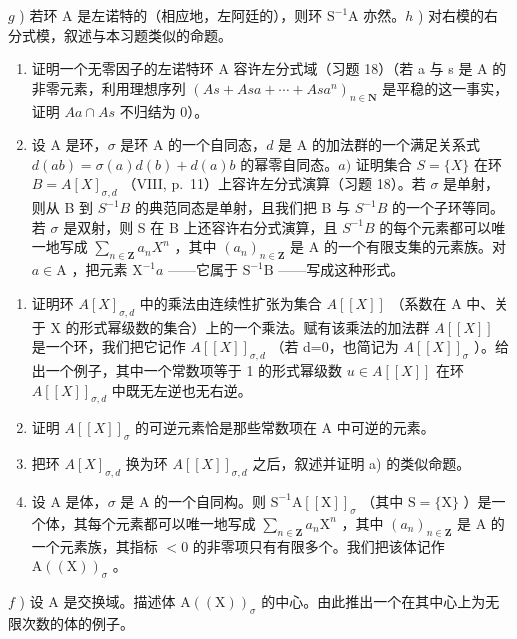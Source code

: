 \(g\) ) 若环 A 是左诺特的（相应地，左阿廷的），则环 \(\mathrm{S}^{-1}\mathrm{A}\) 亦然。\(h\) ) 对右模的右分式模，叙述与本习题类似的命题。

\begin{enumerate}
\def\labelenumi{\arabic{enumi})}
\setcounter{enumi}{19}
\item
  证明一个无零因子的左诺特环 A 容许左分式域（习题 18）（若 a 与 s 是 A 的非零元素，利用理想序列 \((As + Asa + \cdots + Asa^{n})_{n \in \mathbf{N}}\) 是平稳的这一事实，证明 \(Aa \cap As\) 不归结为 0）。
\item
  设 A 是环，\(\sigma\) 是环 A 的一个自同态，\(d\) 是 A 的加法群的一个满足关系式 \(d(ab) = \sigma(a)d(b) + d(a)b\) 的幂零自同态。\(a)\) 证明集合 \(S = \{X\}\) 在环 \(B = A[X]_{\sigma,d}\) （VIII, p.~11）上容许左分式演算（习题 18）。若 \(\sigma\) 是单射，则从 B 到 \(S^{-1}B\) 的典范同态是单射，且我们把 B 与 \(S^{-1}B\) 的一个子环等同。若 \(\sigma\) 是双射，则 S 在 B 上还容许右分式演算，且 \(S^{-1}B\) 的每个元素都可以唯一地写成 \(\sum_{n\in\mathbf{Z}}a_nX^n\) ，其中 \((a_n)_{n\in\mathbf{Z}}\) 是 A 的一个有限支集的元素族。对 \(a \in \mathrm{A}\) ，把元素 \(\mathrm{X}^{-1}a\) ——它属于 \(\mathrm{S}^{-1}\mathrm{B}\) ——写成这种形式。
\end{enumerate}

\begin{enumerate}
\def\labelenumi{\alph{enumi})}
\setcounter{enumi}{1}
\item
  证明环 \(A[X]_{\sigma,d}\) 中的乘法由连续性扩张为集合 \(A[[X]]\) （系数在 A 中、关于 X 的形式幂级数的集合）上的一个乘法。赋有该乘法的加法群 \(A[[X]]\) 是一个环，我们把它记作 \(A[[X]]_{\sigma,d}\) （若 d=0，也简记为 \(A[[X]]_{\sigma}\) ）。给出一个例子，其中一个常数项等于 1 的形式幂级数 \(u\in A[[X]]\) 在环 \(A[[X]]_{\sigma,d}\) 中既无左逆也无右逆。
\item
  证明 \(A[[X]]_{\sigma}\) 的可逆元素恰是那些常数项在 A 中可逆的元素。
\item
  把环 \(A[X]_{\sigma,d}\) 换为环 \(A[[X]]_{\sigma,d}\) 之后，叙述并证明 a) 的类似命题。
\item
  设 A 是体，\(\sigma\) 是 A 的一个自同构。则 \(\mathrm{S}^{-1}\mathrm{A}[[\mathrm{X}]]_{\sigma}\) （其中 \(\mathrm{S} = \{\mathrm{X}\}\) ）是一个体，其每个元素都可以唯一地写成 \(\sum_{n\in \mathbf{Z}}a_n\mathrm{X}^n\) ，其中 \((a_{n})_{n\in \mathbf{Z}}\) 是 A 的一个元素族，其指标 \(< 0\) 的非零项只有有限多个。我们把该体记作 \(\mathrm{A}((\mathrm{X}))_{\sigma}\) 。
\end{enumerate}

\(f\) ) 设 A 是交换域。描述体 \(\mathrm{A}((\mathrm{X}))_{\sigma}\) 的中心。由此推出一个在其中心上为无限次数的体的例子。

